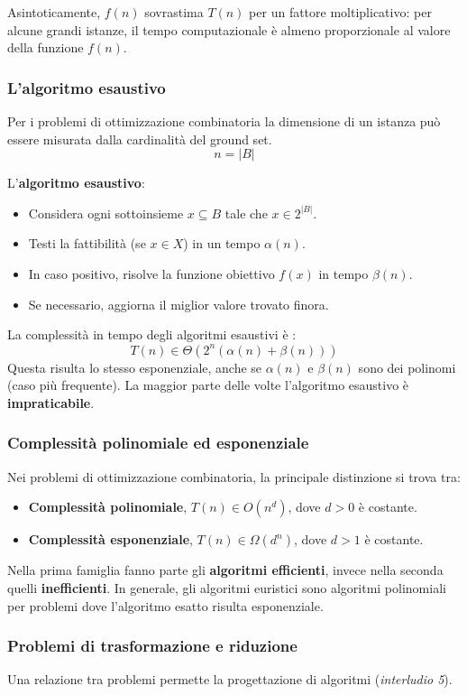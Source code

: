 \documentclass{article}
\begin{document}
Asintoticamente, $f(n)$ sovrastima $T(n)$ per un fattore moltiplicativo: per alcune grandi istanze,
il tempo computazionale è almeno proporzionale al valore della funzione $f(n)$.

\subsubsection{L'algoritmo esaustivo}
Per i problemi di ottimizzazione combinatoria la dimensione di un istanza può essere misurata
dalla cardinalità del ground set.
$$n=|B|$$

L'\textbf{algoritmo esaustivo}:
\begin{itemize}
    \item Considera ogni sottoinsieme $x\subseteq B$ tale che $x\in 2^{|B|}$.
    \item Testi la fattibilità (se $x\in X$) in un tempo $\alpha(n)$.
    \item In caso positivo, risolve la funzione obiettivo $f(x)$ in tempo $\beta(n)$.
    \item Se necessario, aggiorna il miglior valore trovato finora.
\end{itemize}

La complessità in tempo degli algoritmi esaustivi è :
$$T(n)\in\Theta\left( 2^n\left(\alpha(n)+\beta(n)\right) \right)$$
Questa risulta lo stesso esponenziale, anche se $\alpha(n)$ e $\beta(n)$ sono dei
polinomi (caso più frequente). La maggior parte delle volte l'algoritmo esaustivo
è \textbf{impraticabile}.

\subsubsection{Complessità polinomiale ed esponenziale}
Nei problemi di ottimizzazione combinatoria, la principale distinzione si trova tra:
\begin{itemize}
    \item \textbf{Complessità polinomiale}, $T(n)\in O(n^d)$, dove $d>0$ è costante.
    \item \textbf{Complessità esponenziale}, $T(n)\in\Omega(d^n)$, dove $d>1$ è costante.
\end{itemize}
Nella prima famiglia fanno parte gli \textbf{algoritmi efficienti}, invece nella seconda
quelli \textbf{inefficienti}. In generale, gli algoritmi euristici sono algoritmi polinomiali
per problemi dove l'algoritmo esatto risulta esponenziale.
\subsubsection{Problemi di trasformazione e riduzione}
Una relazione tra problemi permette la progettazione di algoritmi (\textit{interludio 5}).
\end{document}

